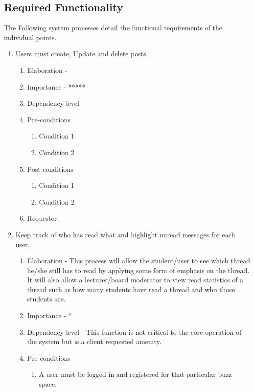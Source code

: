 \documentclass[12pt]{article}
\begin{document}
\newpage %
\subsection{Required Functionality}
The Following system processes detail the functional requirements of the individual points.
\begin{enumerate}
  \item Users must create, Update and delete posts. %
  \begin{enumerate}
    \item Elaboration - 
    \item Importance - *****
    \item Dependency level - 
    \item Pre-conditions
    \begin{enumerate}
    	\item Condition 1
    	\item Condition 2
    \end{enumerate}
        \item Post-conditions
    \begin{enumerate}
    	\item Condition 1
    	\item Condition 2
    \end{enumerate}
    \item Requester
  \end{enumerate}
\newpage %
  \item Keep track of who has read what and highlight unread messages for each user. %
  \begin{enumerate}
    \item Elaboration - This process will allow the student/user to see which thread he/she still has to read by applying some form of emphasis on the thread. It will also allow a lecturer/board moderator to view read statistics of a thread such as how many students have read a thread and who those students are.
    \item Importance - *
    \item Dependency level - This function is not critical to the core operation of the system but is a client requested amenity. 
    \item Pre-conditions
    \begin{enumerate}
    	\item A user must be logged in and registered for that particular buzz space.

\end{enumerate}
\end{enumerate}
\end{enumerate}
\end{document}
